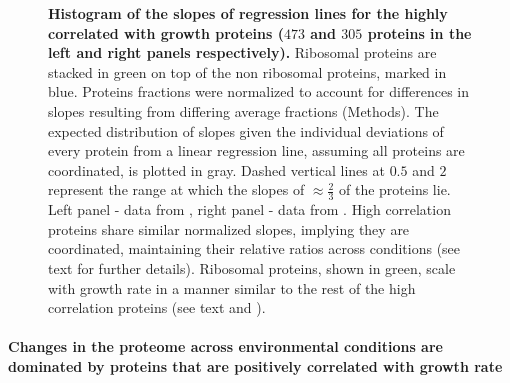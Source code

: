 \documentclass[10pt,letterpaper]{article}
\newcommand{\hGlobal}{$473$}
\newcommand{\vnGlobal}{$305$}
\newcommand{\vGlobal}{\vnGlobal{}}
\begin{document}
\begin{figure}[h]
\begin{center}
\caption{\label{fig:globalfit}
{\bf Histogram of the slopes of regression lines for the highly correlated with growth proteins (\hGlobal{} and \vGlobal{} proteins in the left and right panels respectively).}
    Ribosomal proteins are stacked in green on top of the non ribosomal proteins, marked in blue.
    Proteins fractions were normalized to account for differences in slopes resulting from differing average fractions (Methods).
    The expected distribution of slopes given the individual deviations of every protein from a linear regression line, assuming all proteins are coordinated, is plotted in gray.
    Dashed vertical lines at $0.5$ and $2$ represent the range at which the slopes of $\approx \frac{2}{3}$ of the proteins lie.
    Left panel - data from \cite{Schmidt2015}, right panel - data from \cite{Peebo_2015}.
    High correlation proteins share similar normalized slopes, implying they are coordinated, maintaining their relative ratios across conditions (see text for further details).
    Ribosomal proteins, shown in green, scale with growth rate in a manner similar to the rest of the high correlation proteins (see text and ).
%
}
\end{center}
\end{figure}

\paragraph{Changes in the proteome across environmental conditions are dominated by proteins that are positively correlated with growth rate}
\end{document}
